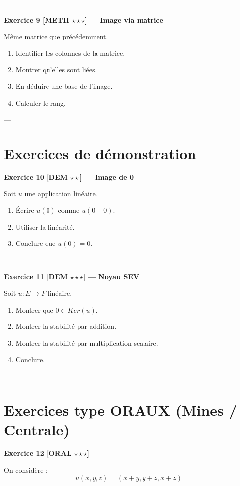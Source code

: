 \documentclass[11pt,a4paper]{article}
\begin{document}
---

\textbf{Exercice 9 [METH $\star\star\star$] — Image via matrice}

Même matrice que précédemment.

\begin{enumerate}
\item Identifier les colonnes de la matrice.
\item Montrer qu’elles sont liées.
\item En déduire une base de l’image.
\item Calculer le rang.
\end{enumerate}

---

\section{Exercices de démonstration}

\textbf{Exercice 10 [DEM $\star\star$] — Image de 0}

Soit $u$ une application linéaire.

\begin{enumerate}
\item Écrire $u(0)$ comme $u(0+0)$.
\item Utiliser la linéarité.
\item Conclure que $u(0)=0$.
\end{enumerate}

---

\textbf{Exercice 11 [DEM $\star\star\star$] — Noyau SEV}

Soit $u : E \to F$ linéaire.

\begin{enumerate}
\item Montrer que $0 \in Ker(u)$.
\item Montrer la stabilité par addition.
\item Montrer la stabilité par multiplication scalaire.
\item Conclure.
\end{enumerate}

---

\section{Exercices type ORAUX (Mines / Centrale)}

\textbf{Exercice 12 [ORAL $\star\star\star$]}

On considère :
\[
u(x,y,z) = (x+y, y+z, x+z)
\]
\end{document}
